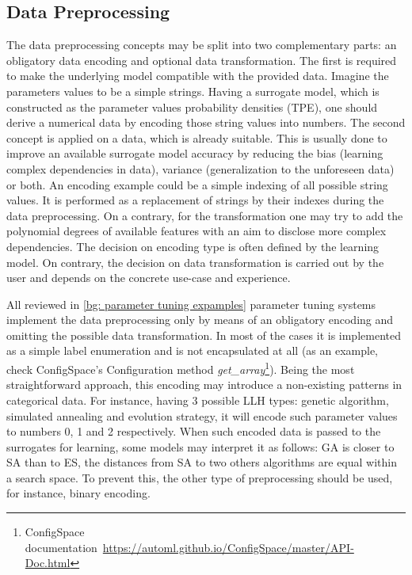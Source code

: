 \subsection{Data Preprocessing}\label{impl: preprocessing}
The data preprocessing concepts may be split into two complementary parts: an obligatory data encoding and optional data transformation. The first is required to make the underlying model compatible with the provided data. Imagine the parameters values to be a simple strings. Having a surrogate model, which is constructed as the parameter values probability densities (TPE), one should derive a numerical data by encoding those string values into numbers. The second concept is applied on a data, which is already suitable. This is usually done to improve an available surrogate model accuracy by reducing the bias (learning complex dependencies in data), variance (generalization to the unforeseen data) or both. An encoding example could be a simple indexing of all possible string values. It is performed as a replacement of strings by their indexes during the data preprocessing. On a contrary, for the transformation one may try to add the polynomial degrees of available features with an aim to disclose more complex dependencies. The decision on encoding type is often defined by the learning model. On contrary, the decision on data transformation is carried out by the user and depends on the concrete use-case and experience.

All reviewed in \cref{bg: parameter tuning expamples} parameter tuning systems implement the data preprocessing only by means of an obligatory encoding and omitting the possible data transformation. In most of the cases it is implemented as a simple label enumeration and is not encapsulated at all (as an example, check ConfigSpace's Configuration method \emph{get\_array}\footnote{ConfigSpace documentation~\url{https://automl.github.io/ConfigSpace/master/API-Doc.html}}). Being the most straightforward approach, this encoding may introduce a non-existing patterns in categorical data. For instance, having 3 possible LLH types: genetic algorithm, simulated annealing and evolution strategy, it will encode such parameter values to numbers 0, 1 and 2 respectively. When such encoded data is passed to the surrogates for learning, some models may interpret it as follows: GA is closer to SA than to ES, the distances from SA to two others algorithms are equal within a search space. To prevent this, the other type of preprocessing should be used, for instance, binary encoding.

